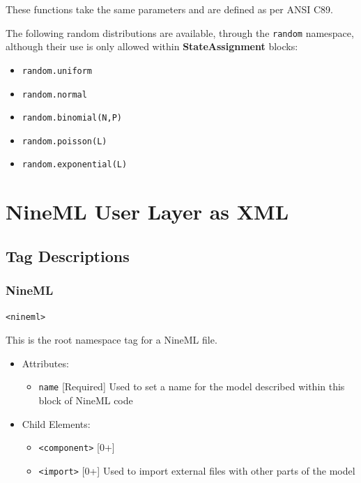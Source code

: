 \documentclass{article}
\newcommand{\StateAssignment}{{\bf{StateAssignment}}\xspace}
\begin{document}
These functions take the same parameters and are defined as per ANSI C89.

The following random distributions are available, through the \verb|random|
namespace,
although their use is only allowed within \StateAssignment blocks:

\begin{itemize}
\item \verb|random.uniform|
\item \verb|random.normal|
\item \verb|random.binomial(N,P)|
\item \verb|random.poisson(L)|
\item \verb|random.exponential(L)|
\end{itemize}

\pagebreak

\section{NineML User Layer as XML}

\subsection{Tag Descriptions}

\subsubsection{NineML}
%
\begin{lstlisting}
<nineml>
\end{lstlisting}

This is the root namespace tag for a NineML file.

\begin{itemize}
\item Attributes:
%
\begin{itemize}
\item \verb|name| {[}Required{]} Used to set a name for the model
described within this block of NineML code
\end{itemize}

\item Child Elements:
%
\begin{itemize}
\item \verb|<component>| {[}0+{]}
\item \verb|<import>| {[}0+{]} Used to import external files with
other parts of the model
\end{itemize}

\end{itemize}
\end{document}
